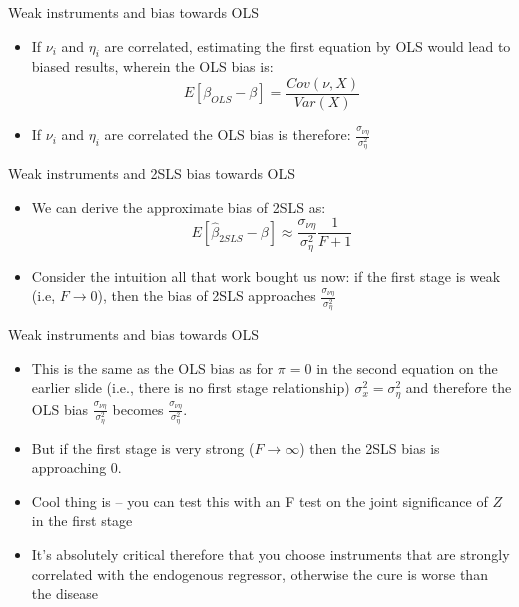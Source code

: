 \documentclass{beamer}
\begin{document}
\begin{frame}{Weak instruments and bias towards OLS}

  \begin{itemize}
    \item If $\nu_i$ and $\eta_i$ are correlated, estimating the first equation by OLS would lead to biased results, wherein the OLS bias is:$$E[\beta_{OLS} - \beta] = \frac{ Cov(\nu, X)}{Var(X)}$$
    \item If $\nu_i$ and $\eta_i$ are correlated the OLS bias is therefore: $\frac{\sigma_{\nu \eta}}{\sigma^2_\eta}$
  \end{itemize}

\end{frame}


\begin{frame}{Weak instruments and 2SLS bias towards OLS}

  \begin{itemize}
    \item We can derive the approximate bias of 2SLS as:$$E[\widehat{\beta}_{2SLS} - \beta] \approx \frac{\sigma_{\nu \eta}}{\sigma^2_\eta} \frac{1}{F+1}$$
    \item Consider the intuition all that work bought us now: if the first stage is weak (i.e, $F\rightarrow{0}$), then the bias of 2SLS approaches $\frac{\sigma_{\nu \eta}}{\sigma^2_\eta}$
  \end{itemize}
\end{frame}

\begin{frame}{Weak instruments and bias towards OLS}

  \begin{itemize}
    \item This is the same as the OLS bias as for $\pi=0$ in the second equation on the earlier slide (i.e., there is no first stage relationship) $\sigma^2_x = \sigma^2_\eta$ and therefore the OLS bias $\frac{\sigma_{\nu \eta}}{\sigma^2_\eta}$ becomes $\frac{\sigma_{\nu \eta}}{\sigma^2_\eta}$.
    \item But if the first stage is very strong ($F\rightarrow{\infty}$) then the 2SLS bias is approaching 0.
    \item Cool thing is -- you can test this with an F test on the joint significance of $Z$ in the first stage
    \item It's absolutely critical therefore that you choose instruments that are strongly correlated with the endogenous regressor, otherwise the cure is worse than the disease
  \end{itemize}

\end{frame}
\end{document}
